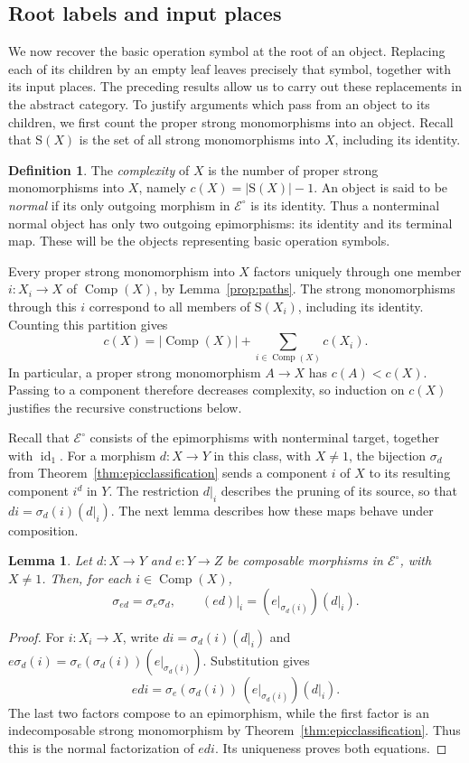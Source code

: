 \documentclass[11pt,a4paper]{article}
\theoremstyle{plain}
\newtheorem{lemma}[theorem]{Lemma}
\theoremstyle{definition}
\newtheorem{definition}[theorem]{Definition}
\theoremstyle{remark}
\newcommand{\Icat}{\mathcal E^\circ}
\newcommand{\one}{1}
\newcommand{\id}{\operatorname{id}}
\newcommand{\Occ}{\mathrm{S}}
\newcommand{\Comp}{\operatorname{Comp}}
\begin{document}
\subsection{Root labels and input places}\label{sec:roots}
We now recover the basic operation symbol at the root of an
object. Replacing each of its children by an empty leaf leaves
precisely that symbol, together with its input places. The
preceding results allow us to carry out these replacements in
the abstract category. To justify arguments which pass from an
object to its children, we first count the proper strong
monomorphisms into an object. Recall that $\Occ(X)$ is the set
of all strong monomorphisms into $X$, including its identity.
\begin{definition}\label{def:complexity-normal}
The \emph{complexity} of $X$ is the number of proper strong
monomorphisms into $X$, namely $c(X)=|\Occ(X)|-1$.
An object is said to be \emph{normal} if its only outgoing morphism
in $\Icat$ is its identity. Thus a nonterminal normal object has
only two outgoing epimorphisms: its identity and its terminal map.
These will be the objects representing basic operation symbols.
\end{definition}

Every proper strong monomorphism into $X$ factors uniquely through
one member $i:X_i\to X$ of $\Comp(X)$, by
Lemma~\ref{prop:paths}. The strong monomorphisms through this
$i$ correspond to all members of $\Occ(X_i)$, including its identity.
Counting this partition gives
\begin{equation}\label{eq:complexity}
c(X)=|\Comp(X)|+\sum_{i\in\Comp(X)}c(X_i).
\end{equation}
In particular, a proper strong monomorphism $A\to X$ has
$c(A)<c(X)$. Passing to a component therefore decreases
complexity, so induction on $c(X)$ justifies the recursive
constructions below.

Recall that $\Icat$ consists of the epimorphisms with
nonterminal target, together with $\id_\one$. For a morphism
$d:X\to Y$ in this class, with $X\ne\one$, the bijection
$\sigma_d$ from Theorem~\ref{thm:epicclassification} sends
a component $i$ of $X$ to its resulting component $i^d$ in $Y$.
The restriction $d|_i$ describes the pruning of its source,
so that $di=\sigma_d(i)(d|_i)$. The next lemma describes how
these maps behave under composition.
\begin{lemma}\label{lem:transport}
Let $d:X\to Y$ and $e:Y\to Z$ be composable morphisms in
$\Icat$, with $X\ne\one$. Then, for each $i\in\Comp(X)$,
\[
 \sigma_{ed}=\sigma_e\sigma_d,\qquad
 (ed)|_i=(e|_{\sigma_d(i)})(d|_i).
\]
\end{lemma}
\begin{proof}
For $i:X_i\to X$, write $di=\sigma_d(i)(d|_i)$ and
$e\sigma_d(i)=\sigma_e(\sigma_d(i))(e|_{\sigma_d(i)})$.
Substitution gives
\[
edi=\sigma_e(\sigma_d(i))\,(e|_{\sigma_d(i)})(d|_i).
\]
The last two factors compose to an epimorphism, while the first
factor is an indecomposable strong monomorphism by
Theorem~\ref{thm:epicclassification}. Thus this is the normal
factorization of $edi$. Its uniqueness proves both equations.
\end{proof}
\end{document}
